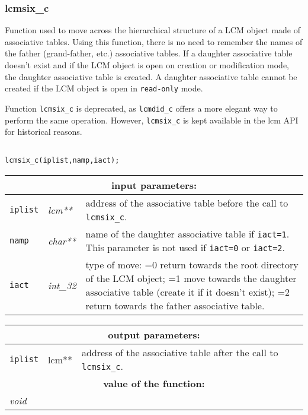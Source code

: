 \subsubsection{lcmsix\_c}

Function used to move across the hierarchical structure of a LCM object made of
associative tables. Using this function, there is no need to remember the names of
the father (grand-father, etc.) associative tables. If a daughter associative table doesn't
exist and if the LCM object is open on creation or modification mode, the daughter
associative table is created. A daughter associative table cannot be created if the
LCM object is open in {\tt read-only} mode.

\vskip 0.4cm

Function {\tt lcmsix\_c} is deprecated, as {\tt lcmdid\_c} offers a more elegant way to perform the same operation.
However, {\tt lcmsix\_c} is kept available in the {\sc lcm} API for historical reasons.

\begin{verbatim}

lcmsix_c(iplist,namp,iact);
\end{verbatim}

\noindent
\begin{tabular}{|p{1.5cm}|p{2cm}|p{11cm}|}
\hline
\multicolumn{3}{|c|}{\bf input parameters:} \\
\hline
{\tt iplist} & {\it lcm**} & address of the associative table before the call to {\tt lcmsix\_c}. \\
\hline
{\tt namp} & {\it char**} & name of the daughter associative table if {\tt iact=1}. 
                                   This parameter is not used if {\tt iact=0} or {\tt iact=2}. \\
\hline
{\tt iact} & {\it int\_32} & type of move: =0 return towards the root directory of the LCM object; 
                                   =1 move towards the daughter associative table (create it if it doesn't exist); 
				   =2 return towards the father associative table. \\
\hline
\end{tabular}

\vskip 0.8cm

\noindent
\begin{tabular}{|p{1.5cm}|p{2cm}|p{11cm}|}
\hline
\multicolumn{3}{|c|}{\bf output parameters:} \\
\hline
{\tt iplist} & lcm** & address of the associative table after the call to {\tt lcmsix\_c}. \\
\hline
\multicolumn{3}{|c|}{\bf value of the function:} \\
\hline
\multicolumn{2}{|l|}{\it void} &  \\
\hline
\end{tabular}


